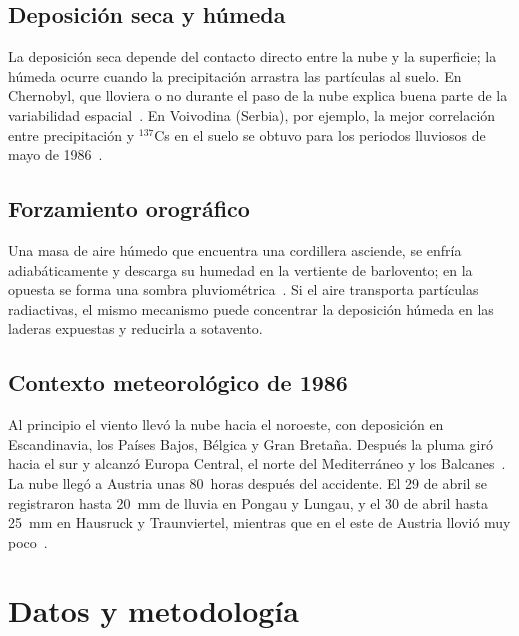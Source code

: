 \subsection{Deposici\'on seca y h\'umeda}
La deposici\'on seca depende del contacto directo entre la nube y la superficie; la h\'umeda ocurre cuando la precipitaci\'on arrastra las part\'iculas al suelo. En Chernobyl, que lloviera o no durante el paso de la nube explica buena parte de la variabilidad espacial~\cite{oecd2002}. En Voivodina (Serbia), por ejemplo, la mejor correlaci\'on entre precipitaci\'on y $^{137}$Cs en el suelo se obtuvo para los periodos lluviosos de mayo de 1986~\cite{kalkan2021}.

\subsection{Forzamiento orogr\'afico}
Una masa de aire h\'umedo que encuentra una cordillera asciende, se enfr\'ia adiab\'aticamente y descarga su humedad en la vertiente de barlovento; en la opuesta se forma una sombra pluviom\'etrica~\cite{garcia2003}. Si el aire transporta part\'iculas radiactivas, el mismo mecanismo puede concentrar la deposici\'on h\'umeda en las laderas expuestas y reducirla a sotavento.

\subsection{Contexto meteorol\'ogico de 1986}
Al principio el viento llev\'o la nube hacia el noroeste, con deposici\'on en Escandinavia, los Pa\'ises Bajos, B\'elgica y Gran Breta\~na. Despu\'es la pluma gir\'o hacia el sur y alcanz\'o Europa Central, el norte del Mediterr\'aneo y los Balcanes~\cite{oecd2002}. La nube lleg\'o a Austria unas 80~horas despu\'es del accidente. El 29 de abril se registraron hasta 20~mm de lluvia en Pongau y Lungau, y el 30 de abril hasta 25~mm en Hausruck y Traunviertel, mientras que en el este de Austria llovi\'o muy poco~\cite{geosphere2026}.

\section{Datos y metodolog\'ia}
